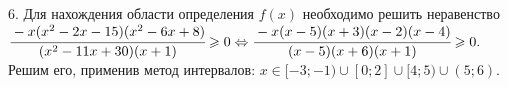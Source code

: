6. Для нахождения области определения $f(x)$ необходимо решить неравенство\\ $\cfrac{-x(x^2-2x-15)(x^2-6x+8)}{(x^2-11x+30)(x+1)}\geqslant0
\Leftrightarrow \cfrac{-x(x-5)(x+3)(x-2)(x-4)}{(x-5)(x+6)(x+1)}\geqslant0.$ Решим его, применив метод интервалов:
$x\in[-3;-1)\cup[0;2]\cup[4;5)\cup(5;6).$
\begin{figure}[ht!]
\end{figure}\\
